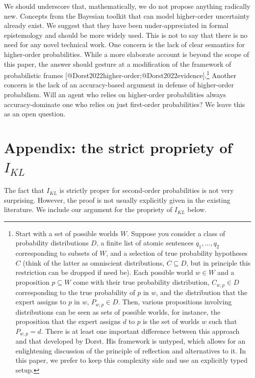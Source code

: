 \documentclass[
  letterpaper,
  DIV=11,
  numbers=noendperiod]{scrartcl}
\begin{document}
We should underscore that, mathematically, we do not propose anything
radically new. Concepts from the Bayesian toolkit that can model
higher-order uncertainty already exist. We suggest that they have been
under-appreciated in formal epistemology and should be more widely used.
This is not to say that there is no need for any novel technical work.
One concern is the lack of clear semantics for higher-order
probabilities. While a more elaborate account is beyond the scope of
this paper, the answer should gesture at a modification of the framework
of probabilistic frames
{[}@Dorst2022higher-order;@Dorst2022evidence{]}.\footnote{Start with a
  set of possible worlds \(W\). Suppose you consider a class of
  probability distributions \(D\), a finite list of atomic sentences
  \(q_1, \dots, q_2\) corresponding to subsets of \(W\), and a selection
  of true probability hypotheses \(C\) (think of the latter as
  omniscient distributions, \(C\subseteq D\), but in principle this
  restriction can be dropped if need be). Each possible world \(w\in W\)
  and a proposition \(p\subseteq W\) come with their true probability
  distribution, \(C_{w,p}\in D\) corresponding to the true probability
  of \(p\) in \(w\), and the distribution that the expert assigns to
  \(p\) in \(w\), \(P_{w,p}\in D\). Then, various propositions involving
  distributions can be seen as sets of possible worlds, for instance,
  the proposition that the expert assigns \(d\) to \(p\) is the set of
  worlds \(w\) such that \(P_{w,p}=d\). There is at least one important
  difference between this approach and that developed by Dorst. His
  framework is untyped, which allows for an enlightening discussion of
  the principle of reflection and alternatives to it. In this paper, we
  prefer to keep this complexity side and use an explicitly typed setup.}
Another concern is the lack of an accuracy-based argument in defense of
higher-order probabilism. Will an agent who relies on higher-order
probabilities always accuracy-dominate one who relies on just
first-order probabilities? We leave this as an open question.

\section*{\texorpdfstring{Appendix: the strict propriety of
\(I_{KL}\)}{Appendix: the strict propriety of I\_\{KL\}}}\label{appendix-the-strict-propriety-of-i_kl}

The fact that \(I_{KL}\) is strictly proper for second-order
probabilities is not very surprising. However, the proof is not usually
explicitly given in the existing literature. We include our argument for
the propriety of \(I_{KL}\) below.
\end{document}
